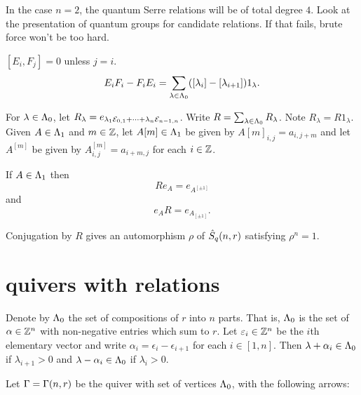 \documentclass[a4paper, 11pt]{report}
\begin{document}
\begin{lemma}[quantum Serre relations: $n=2$]
{\color{gray} In the case $n=2$, the quantum Serre relations will be of total degree $4$. Look at the presentation of quantum groups for candidate relations. If that fails, brute force won't be too hard.}
\end{lemma}

\begin{lemma}
$[E_i, F_j] = 0$ unless $j=i$.
\begin{equation*}
E_i F_i - F_i E_i = \sum_{\lambda\in{\Lambda_0}} ([\lambda_i] - [\lambda_{i+1}])1_\lambda.
\end{equation*}
\end{lemma}


{\color{gray}
For $\lambda\in{\Lambda_0}$, let $R_\lambda = e_{\lambda_1\mathcal{E}_{0,1}+\cdots +\lambda_n\mathcal{E}_{n-1,n}}$. Write $R = \sum_{\lambda\in{\Lambda_0}} R_\lambda$. Note $R_\lambda = R 1_\lambda$. Given $A\in{\Lambda_1}$ and $m\in\mathbb{Z}$, let $A[m]\in{\Lambda_1}$ be given by $A[m]_{i,j} = a_{i,j+m}$ and let $A^{[m]}$ be given by $A^{[m]}_{i,j} = a_{i+m,j}$ for each $i\in\mathbb{Z}$.

\begin{lemma}[Shifting]
If $A\in{\Lambda_1}$ then
\begin{equation*}
R e_A = e_{A^{[\pm 1]}}
\end{equation*}
and
\begin{equation*}
e_A R = e_{A_{[\pm 1]}}.
\end{equation*}
\end{lemma}

Conjugation by $R$ gives an automorphism $\rho$ of $\hat{S}_q(n,r)$ satisfying $\rho^n = 1$.
}

\section{quivers with relations}

Denote by ${\Lambda_0}$ the set of compositions of $r$ into $n$ parts. That is, ${\Lambda_0}$ is the set of $\alpha\in\mathbb{Z}^n$ with non-negative entries which sum to $r$. Let $\varepsilon_i\in\mathbb{Z}^n$ be the $i$th elementary vector and write $\alpha_i = \epsilon_i  -\epsilon_{i+1}$ for each $i\in [1,n]$. Then $\lambda +\alpha_i\in{\Lambda_0}$ if $\lambda_{i+1}>0$ and $\lambda -\alpha_i\in{\Lambda_0}$ if $\lambda_i >0$.

Let $\Gamma=\Gamma(n,r)$ be the quiver with set of vertices ${\Lambda_0}$, with the following arrows:
\end{document}
